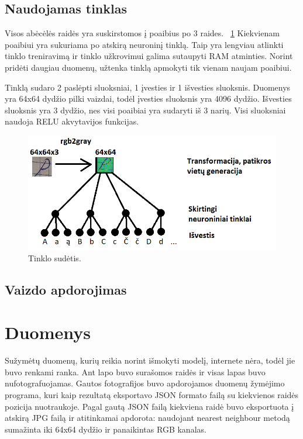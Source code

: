 \documentclass[conference]{IEEEtran}
\begin{document}
\subsection{Naudojamas tinklas}

Visos abėcėlės raidės yra suskirstomos į poaibius po 3 raides. ~\ref{fig1} Kiekvienam poaibiui yra
sukuriama po atskirą neuroninį tinklą. Taip yra lengviau atlinkti tinklo treniravimą
ir tinklo užkrovimui galima sutaupyti RAM atminties. Norint pridėti daugiau
duomenų, užtenka tinklą apmokyti tik vienam naujam poaibiui.
\par
Tinklą sudaro 2 paslėpti sluoksniai, 1 įvesties ir 1 išvesties sluoksnis. Duomenys
yra 64x64 dydžio pilki vaizdai, todėl įvesties sluoksnis yra 4096 dydžio. Išvesties
sluoksnis yra 3 dydžio, nes visi poaibiai yra sudaryti iš 3 narių. Visi sluoksniai naudoja
RELU akvytavijos funkcijas.

\begin{figure}[!h] %
\centerline{\includegraphics[scale=0.4] {images/1.png}}
\caption{Tinklo sudėtis.}
\label{fig1}
\end{figure}

\subsection{Vaizdo apdorojimas}

\section{Duomenys}

Sužymėtų duomenų, kurių reikia norint išmokyti modelį, internete nėra, todėl
jie buvo renkami ranka. Ant lapo buvo surašomos raidės ir visas lapas buvo
nufotografuojamas. Gautos fotografijos buvo apdorojamos duomenų žymėjimo programa,
kuri kaip rezultatą eksportavo JSON formato failą su kiekvienos raidės pozicija
nuotraukoje. Pagal gautą JSON failą kiekviena raidė buvo eksportuota į atskirą JPG
failą ir atitinkamai apdorota: naudojant nearest neighbour metodą sumažinta iki
64x64 dydžio ir panaikintas RGB kanalas.
\end{document}
